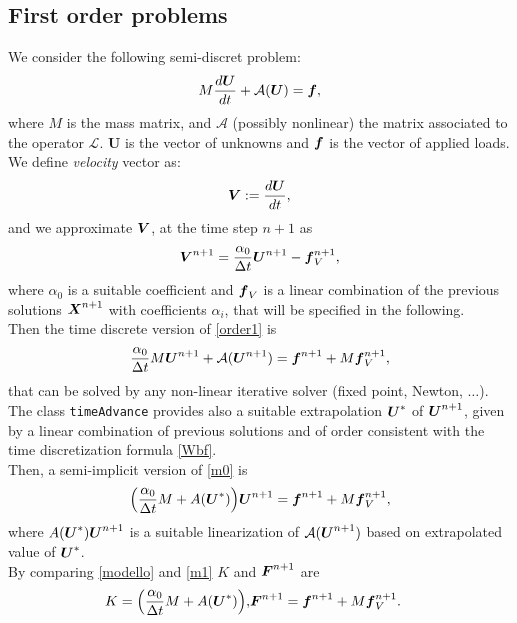 \documentclass[english,a4paper]{article}
\newcommand{\Xbf}{\text{\mbox{\boldmath $X$}}}
\newcommand{\Ubf}{\text{\mbox{\boldmath $U$}}}
\newcommand{\fbf}{\text{\mbox{\boldmath $f$}}}
\newcommand{\Fbf}{\text{\mbox{\boldmath $F$}}}
\newcommand{\Wbf}{\text{\mbox{\boldmath $V$}}}
\newcommand{\xx}{\boldsymbol}
\begin{document}
\subsection{First  order problems}
We consider the following semi-discret problem:
\begin{equation}\label{order1}
M\frac{d \xx U }{dt} +\mathcal{A}(\xx U) = \fbf ,
\end{equation}
where $M$ is  the mass matrix, and $\mathcal{A}$ (possibly nonlinear) the
matrix associated to the operator $\mathcal{L}$.  $\xx U$ is the
 vector  of unknowns and $\fbf$ is the vector of applied loads.\\
We define {\sl velocity} vector as:
\[
\Wbf:=\frac{d\xx U}{dt},
\]
and we approximate $\Wbf$, at the time step $n+1$ as
\begin{equation}\label{Wbf}
\Wbf^{n+1}=\frac{\alpha_0}{\Delta t}\Ubf^{n+1}- \fbf_V^{n+1},
\end{equation}
where $\alpha_0$ is a suitable coefficient and $\fbf_V$  is a
linear combination of the previous  solutions $\Xbf^{n+1}$ with coefficients
$\alpha_i$, that  will be specified in the following.\\
Then the time discrete version of \eqref{order1} is
\begin{equation}\label{m0}
\frac{\alpha_0}{\Delta t}M\Ubf^{n+1}  +\mathcal{A}(\Ubf^{n+1})=\fbf^{n+1}+ M \fbf_V^{n+1},
\end{equation}
that can be solved by any non-linear iterative solver (fixed point,
Newton, $\dots$). The class \verb"timeAdvance" provides also a
suitable extrapolation $\Ubf^*$ of  $\Ubf^{n+1}$, given by a linear
combination of previous solutions and of order consistent with the
time discretization formula \eqref{Wbf}.\\
Then, a semi-implicit version of
\eqref{m0} is
\begin{equation}\label{m1}
\Big(\frac{\alpha_0}{\Delta t} M +A(\Ubf^*)\Big)\Ubf^{n+1}=\fbf^{n+1}+ M \fbf_V^{n+1},
\end{equation}
where $A(\Ubf^*)\Ubf^{n+1}$ is a suitable linearization of
$\mathcal{A}(\Ubf^{n+1})$ based on extrapolated value  of $\Ubf^*$.\\
By comparing \eqref{modello} and \eqref{m1}  $K$ and $\Fbf^{n+1}$
are
\begin{eqnarray*}
\displaystyle K =\Big(\frac{\alpha_0}{\Delta t} M +A(\Ubf^*)\Big),& \xx F^{n+1}=\xx f^{n+1} + M \fbf_V^{n+1}.
\end{eqnarray*}
\end{document}
